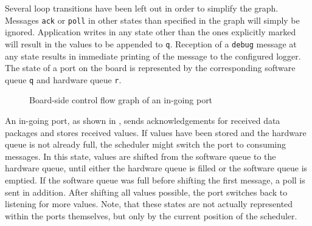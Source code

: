 \documentclass{report}
\begin{document}
Several loop transitions have been left out in order to simplify the graph. Messages \texttt{ack} or \texttt{poll} in other states than specified in the graph will simply be ignored. Application writes in any state other than the ones explicitly marked will result in the values to be appended to \texttt{q}. Reception of a \texttt{debug} message at any state results in immediate printing of the message to the configured logger.\\


The state of a port on the board is represented by the corresponding software queue \texttt{q} and hardware queue \texttt{r}.

\begin{figure}[h]
\centering
{}
\label{fig:cfg:boardIn}
\caption{Board-side control flow graph of an in-going port}
\end{figure}

An in-going port, as shown in , sends acknowledgements for received data packages and stores received values. If values have been stored and the hardware queue is not already full, the scheduler might switch the port to consuming messages. In this state, values are shifted from the software queue to the hardware queue, until either the hardware queue is filled or the software queue is emptied. If the software queue was full before shifting the first message, a poll is sent in addition. After shifting all values possible, the port switches back to listening for more values. 
Note, that these states are not actually represented within the ports themselves, but only by the current position of the scheduler.
\end{document}
